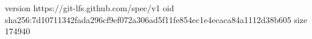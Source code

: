version https://git-lfs.github.com/spec/v1
oid sha256:7d10711342fada296cf9ef072a306ad5f11fe854ec1e4ecaca84a1112d38b605
size 174940
